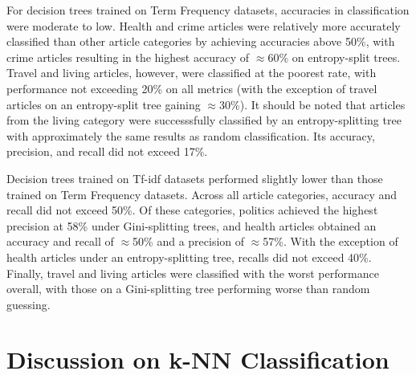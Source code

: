 \documentclass[11pt]{article}
\begin{document}
For decision trees trained on Term Frequency datasets, accuracies in classification were moderate to low. Health and crime articles were relatively more accurately classified than other article categories by achieving accuracies above 50\%, with crime articles resulting in the highest accuracy of $\approx$60\% on entropy-split trees.
Travel and living articles, however, were classified at the poorest rate, with performance not exceeding 20\% on all metrics (with the exception of travel articles on an entropy-split tree gaining $\approx$30\%).
It should be noted that articles from the living category were successsfully classified by an entropy-splitting tree with approximately the same results as random classification.
Its accuracy, precision, and recall did not exceed 17\%.

Decision trees trained on Tf-idf datasets performed slightly lower than those trained on Term Frequency datasets.
Across all article categories, accuracy and recall did not exceed 50\%.
Of these categories, politics achieved the highest precision at 58\% under Gini-splitting trees, and health articles obtained an accuracy and recall of $\approx$50\% and a precision of $\approx$57\%.
With the exception of health articles under an entropy-splitting tree, recalls did not exceed 40\%.
Finally, travel and living articles were classified with the worst performance overall, with those on a Gini-splitting tree performing worse than random guessing.

\section{Discussion on k-NN Classification}


{}

\end{document}
